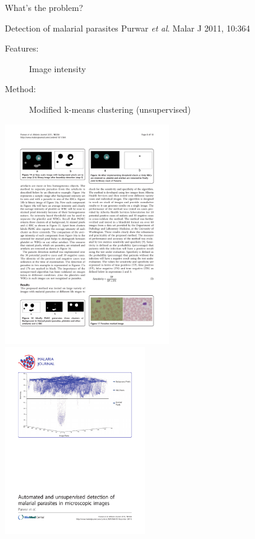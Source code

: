 \documentclass[pdf]{beamer}
\begin{document}
\begin{frame}{What's the problem?}
\begin{exampleblock}{Detection of malarial parasites \vskip-1mm{\tiny Purwar \textit{et al}. Malar J 2011, 10:364}}
\begin{description}
	\item[Features:] Image intensity
	\item[Method:] Modified k-means clustering (unsupervised)
\end{description}
\begin{center}
	\includegraphics[width=0.54\textwidth]{purwar02.pdf}
	\includegraphics[width=0.46\textwidth]{purwar01.pdf}
\end{center}
\end{exampleblock}
\end{frame}
\end{document}
